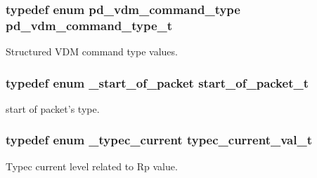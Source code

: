 \hypertarget{group__usb__pd__stack_ga3da8531f25ed451f0392fc7efdf7fabe}{
\subsubsection[{pd\-\_\-vdm\-\_\-command\-\_\-type\-\_\-t}]{\setlength{\rightskip}{0pt plus 5cm}typedef enum {\bf pd\-\_\-vdm\-\_\-command\-\_\-type}  {\bf pd\-\_\-vdm\-\_\-command\-\_\-type\-\_\-t}}}\label{group__usb__pd__stack_ga3da8531f25ed451f0392fc7efdf7fabe}


Structured V\-D\-M command type values. 

\hypertarget{group__usb__pd__stack_ga59170ea474bbce078de8ffb3eea617aa}{
\subsubsection[{start\-\_\-of\-\_\-packet\-\_\-t}]{\setlength{\rightskip}{0pt plus 5cm}typedef enum {\bf \-\_\-start\-\_\-of\-\_\-packet}  {\bf start\-\_\-of\-\_\-packet\-\_\-t}}}\label{group__usb__pd__stack_ga59170ea474bbce078de8ffb3eea617aa}


start of packet's type. 

\hypertarget{group__usb__pd__stack_ga875b585c994b83a1c1fd1e81bac28f7a}{
\subsubsection[{typec\-\_\-current\-\_\-val\-\_\-t}]{\setlength{\rightskip}{0pt plus 5cm}typedef enum {\bf \-\_\-typec\-\_\-current}  {\bf typec\-\_\-current\-\_\-val\-\_\-t}}}\label{group__usb__pd__stack_ga875b585c994b83a1c1fd1e81bac28f7a}


Typec current level related to Rp value. 

